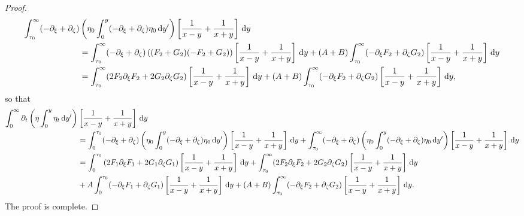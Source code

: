 \documentclass[10pt,reqno,oneside,a4paper, landscape]{article}
\begin{document}
\begin{proof}
\begin{align*} 
\int_{\tau_0}^\infty (- \partial_\xi + \partial_\zeta)&\left( \eta_0 \int^{y}_0 (- \partial_\xi + \partial_\zeta)\eta_0 \,\mathrm{d} y' \right) \left[ \frac{1}{x-y} + \frac{1}{x+y} \right] \,\mathrm{d} y \\
&= \int_{\tau_0}^\infty  (- \partial_\xi + \partial_\zeta)\left( (F_2 + G_2) (- F_2 + G_2) \right) \left[ \frac{1}{x-y} + \frac{1}{x+y} \right] \,\mathrm{d} y + (A+B)\int_{\tau_0}^\infty (- \partial_\xi F_2+ \partial_\zeta G_2) \left[ \frac{1}{x-y} + \frac{1}{x+y} \right] \,\mathrm{d} y\\
&= \int_{\tau_0}^\infty (2 F_2 \partial_\xi F_2 + 2 G_2 \partial_\zeta G_2 )\left[ \frac{1}{x-y} + \frac{1}{x+y} \right] \,\mathrm{d} y + (A+B)\int_{\tau_0}^\infty (- \partial_\xi F_2+ \partial_\zeta G_2) \left[ \frac{1}{x-y} + \frac{1}{x+y} \right] \,\mathrm{d} y,
\end{align*}
so that 
\begin{align*}
\int_0^\infty \partial_t \left( \eta \int^{y}_0\eta_{t} \,\mathrm{d} y' \right) &\left[ \frac{1}{x-y} + \frac{1}{x+y} \right] \,\mathrm{d} y \\
&= \int_0^{\tau_0} (- \partial_\xi + \partial_\zeta)\left( \eta_0 \int^{y}_0 (- \partial_\xi + \partial_\zeta)\eta_0 \,\mathrm{d} y' \right) \left[ \frac{1}{x-y} + \frac{1}{x+y} \right] \,\mathrm{d} y + \int_{\tau_0}^\infty (- \partial_\xi + \partial_\zeta)\left( \eta_0 \int^{y}_0 (- \partial_\xi + \partial_\zeta)\eta_0 \,\mathrm{d} y' \right) \left[ \frac{1}{x-y} + \frac{1}{x+y} \right] \,\mathrm{d} y\\
&= \int_0^{\tau_0} \left( 2 F_1  \partial_\xi F_1 + 2 G_1 \partial_\zeta G_1 \right) \left[ \frac{1}{x-y} + \frac{1}{x+y} \right] \,\mathrm{d} y +\int_{\tau_0}^\infty (2 F_2 \partial_\xi F_2 + 2 G_2 \partial_\zeta G_2 )\left[ \frac{1}{x-y} + \frac{1}{x+y} \right] \,\mathrm{d} y \\
&+ A \int_0^{\tau_0} (-\partial_\xi F_1 + \partial_\zeta G_1) \left[ \frac{1}{x-y} + \frac{1}{x+y} \right] \,\mathrm{d} y + (A+B)\int_{\tau_0}^\infty (- \partial_\xi F_2+ \partial_\zeta G_2) \left[ \frac{1}{x-y} + \frac{1}{x+y} \right] \,\mathrm{d} y.
\end{align*}
The proof is complete. 
\end{proof}
\end{document}

